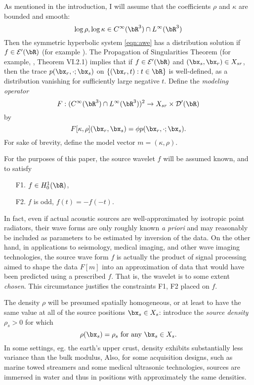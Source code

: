 As mentioned in the introduction, I will assume that the coefficients
$\rho$ and $\kappa$ are bounded and smooth:
\begin{equation}
  \label{eqn:coeff}
  \log \rho, \log \kappa \in C^{\infty}(\bR^3) \cap L^{\infty}(\bR^3)
\end{equation}
Then the symmetric hyperbolic system \ref{eqn:awe} has a distribution
solution if $f \in \cal{E}'(\bR)$ (for example \cite{Lax:PDENotes}). The Propagation of
Singularities Theorem (for example, \cite{Tay:81}, Theorem VI.2.1)
implies that if $f \in \cal{E}'(\bR)$ and $(\bx_s,\bx_r) \in X_{sr}$,
then the trace $p(\bx_r, \cdot;\bx_s)$ on $\{(\bx_r,t): t \in \bR\}$ is well-defined,
as a distribution vanishing for sufficiently large
negative $t$. Define the {\em modeling operator}
\begin{equation}
  \label{eqn:modop}
  F: (C^{\infty}(\bR^3) \cap L^{\infty}(\bR^3))^2 
  \rightarrow X_{sr} \times {\cal D}'(\bR)
\end{equation}
by
\begin{equation}
  \label{eqn:modopdef}
  F[\kappa,\rho](\bx_r,\bx_s) = \phi p(\bx_r,\cdot;\bx_s).
\end{equation}
For sake of brevity, define the model vector $m=(\kappa,\rho)$. 

For the purposes of this paper, the source wavelet $f$ will be assumed
known, and to satisfy
\begin{itemize}
\item[F1. ] $f \in H^1_0(\bR)$,
\item[F2. ] $f$ is odd, $f(t) = -f(-t)$.
\end{itemize}
In fact, even if actual acoustic sources are well-approximated by
isotropic point radiators, their wave forms are only roughly known
{\em a priori} and may reasonably be included as parameters to be
estimated by inversion of the data. On the other hand, in applications
to seismology, medical imaging, and other wave imaging technologies,
the source wave form $f$ is actually the product of signal processing
aimed to shape the data $F[m]$ into an approximation of data that
would have been predicted using a prescribed $f$. That is, the wavelet
is to some extent {\em chosen}. This circumstance justifies the
constraints F1, F2 placed on $f$.

The density $\rho$ will be presumed spatially homogeneous, or at least
to have the same value at all of the source positions $\bx_s\in X_s$:
introduce the {\em source density} $\rho_s > 0$ for which
\begin{equation}
  \label{eqn:rho}
  \rho(\bx_s) = \rho_s\mbox{ for any } \bx_s \in X_s.
\end{equation}
In some settings, eg. the earth's
upper crust, density exhibits substantially less variance than the
bulk modulus, Also, for some acquisition designs, such as marine towed
streamers and some medical ultrasonic technologies, sources are
immersed in water and thus in positions with approximately the same
densities.

